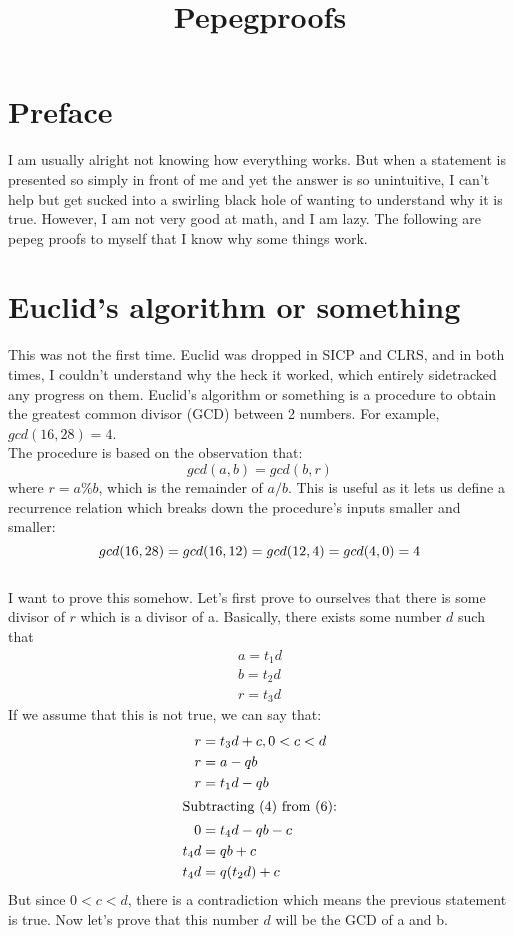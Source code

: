 \documentclass{report}
\title{Pepegproofs}
\begin{document}
  \maketitle
  \section{Preface}
  I am usually alright not knowing how everything works. But when a statement is presented so simply in front of me and yet the answer is so unintuitive, I can't help but get sucked into a swirling black hole of wanting to understand why it is true. However, I am not very good at math, and I am lazy. The following are pepeg proofs to myself that I know why some things work.

  \section{Euclid's algorithm or something}
  This was not the first time. Euclid was dropped in SICP and CLRS, and in both times, I couldn't understand why the heck it worked, which entirely sidetracked any progress on them. Euclid's algorithm or something is a procedure to obtain the greatest common divisor (GCD) between 2 numbers. For example, $gcd(16, 28) = 4$.\\

  The procedure is based on the observation that: $$gcd(a,b) = gcd(b,r)$$ where $r = a \% b$, which is the remainder of $a/b$. This is useful as it lets us define a recurrence relation which breaks down the procedure's inputs smaller and smaller: $$gcd(16,28) = gcd(16,12)\\ =gcd(12,4)\\=gcd(4,0)\\=4$$\\

  I want to prove this somehow. Let's first prove to ourselves that there is some divisor of $r$ which is a divisor of a. Basically, there exists some number $d$ such that
  \begin{align}
    a = t_1d\\
    b = t_2d\\
    r = t_3d
  \end{align}
If we assume that this is not true, we can say that:
  \begin{align}
    r &= t_3d + c, 0 < c < d \\
    r &= a - qb\\
    r &= t_1d - qb\\
    \intertext{Subtracting (4) from (6):}
    0 &= t_4d - qb - c\\
    t_4d &= qb + c\\
    t_4d &= q(t_2d) + c
  \end{align}
But since $0 < c < d$, there is a contradiction which means the previous statement is true. Now let's prove that this number $d$ will be the GCD of a and b.\\
\end{document}
